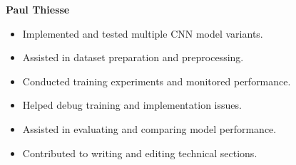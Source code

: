 \noindent\textbf{Paul Thiesse}
\begin{itemize}[leftmargin=1.5em]
    \item Implemented and tested multiple CNN model variants.
    \item Assisted in dataset preparation and preprocessing.
    \item Conducted training experiments and monitored performance.
    \item Helped debug training and implementation issues.
    \item Assisted in evaluating and comparing model performance.
    \item Contributed to writing and editing technical sections.
\end{itemize}
